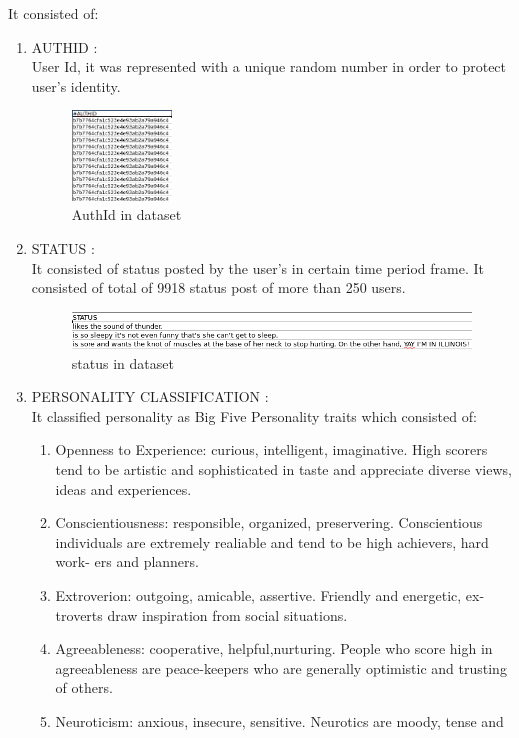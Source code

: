 \documentclass[a4paper, 12pt, onepage]{article}
\begin{document}
\begin{enumerate}
		It consisted of:
		\begin{enumerate}
		\item AUTHID : \\ 
			User Id, it was represented with a unique random number in order to protect user's identity.
      \begin{figure}[h!]
	      \centering
	      \includegraphics[width=100px]{userid.png}
		\caption{AuthId in dataset}
	\end{figure}
		\item STATUS : \\ 
			It consisted of status posted by the user's in certain time period frame. It consisted of total of 9918 status post of more than 250 users.
      \begin{figure}[h!]
	      \includegraphics[width=450px]{status.png}
		\caption{status in dataset}
	\end{figure}
		\item PERSONALITY CLASSIFICATION : \\
			It classified personality as Big Five Personality traits which consisted of:\\
		\begin{enumerate}
		\item Openness to Experience:
			curious, intelligent, imaginative. High scorers
			tend to be artistic and sophisticated in taste and appreciate diverse views,
			ideas and experiences.
		\item Conscientiousness:
			responsible, organized, preservering. Conscientious
			individuals are extremely realiable and tend to be high achievers, hard work-
			ers and planners.
		\item Extroverion:
			outgoing, amicable, assertive. Friendly and energetic, ex-
			troverts draw inspiration from social situations.
		\item Agreeableness:
		cooperative, helpful,nurturing. People who score high in
		agreeableness are peace-keepers who are generally optimistic and trusting of
		others.
		\item Neuroticism:
			anxious, insecure, sensitive. Neurotics are moody, tense and

\end{enumerate}
\end{enumerate}
\end{enumerate}
\end{document}
